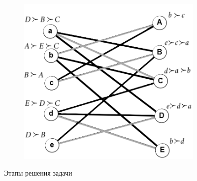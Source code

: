 \documentclass{article}
\begin{document}
\begin{enumerate}
\begin{figure}
\begin{subfigure}[b]{0.47\textwidth}
         \includegraphics[width=\textwidth]{attachments/11/44.png}
         \label{fig:to_bin_11_4}
     \end{subfigure}
     \caption{Этапы решения задачи}
    \label{fig:to_bin_11_max_pairs}
\end{figure}
\clearpage

\end{enumerate}
\end{document}

